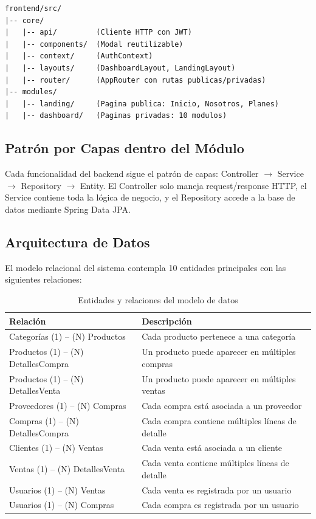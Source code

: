 \documentclass[12pt, letterpaper]{report}
\begin{document}
\begin{lstlisting}[language={},caption={Estructura del frontend}]
frontend/src/
|-- core/
|   |-- api/         (Cliente HTTP con JWT)
|   |-- components/  (Modal reutilizable)
|   |-- context/     (AuthContext)
|   |-- layouts/     (DashboardLayout, LandingLayout)
|   |-- router/      (AppRouter con rutas publicas/privadas)
|-- modules/
|   |-- landing/     (Pagina publica: Inicio, Nosotros, Planes)
|   |-- dashboard/   (Paginas privadas: 10 modulos)
\end{lstlisting}

\subsection{Patrón por Capas dentro del Módulo}

Cada funcionalidad del backend sigue el patrón de capas: Controller $\rightarrow$ Service $\rightarrow$ Repository $\rightarrow$ Entity. El Controller solo maneja request/response HTTP, el Service contiene toda la lógica de negocio, y el Repository accede a la base de datos mediante Spring Data JPA.

\subsection{Arquitectura de Datos}

El modelo relacional del sistema contempla 10 entidades principales con las siguientes relaciones:

\begin{table}[H]
\centering
\caption{Entidades y relaciones del modelo de datos}
\renewcommand{\arraystretch}{1.3}
\begin{tabularx}{\textwidth}{|l|X|}
\hline
\textbf{Relación} & \textbf{Descripción} \\ \hline
Categorías (1) -- (N) Productos & Cada producto pertenece a una categoría \\ \hline
Productos (1) -- (N) DetallesCompra & Un producto puede aparecer en múltiples compras \\ \hline
Productos (1) -- (N) DetallesVenta & Un producto puede aparecer en múltiples ventas \\ \hline
Proveedores (1) -- (N) Compras & Cada compra está asociada a un proveedor \\ \hline
Compras (1) -- (N) DetallesCompra & Cada compra contiene múltiples líneas de detalle \\ \hline
Clientes (1) -- (N) Ventas & Cada venta está asociada a un cliente \\ \hline
Ventas (1) -- (N) DetallesVenta & Cada venta contiene múltiples líneas de detalle \\ \hline
Usuarios (1) -- (N) Ventas & Cada venta es registrada por un usuario \\ \hline
Usuarios (1) -- (N) Compras & Cada compra es registrada por un usuario \\ \hline
\end{tabularx}
\end{table}
\end{document}
